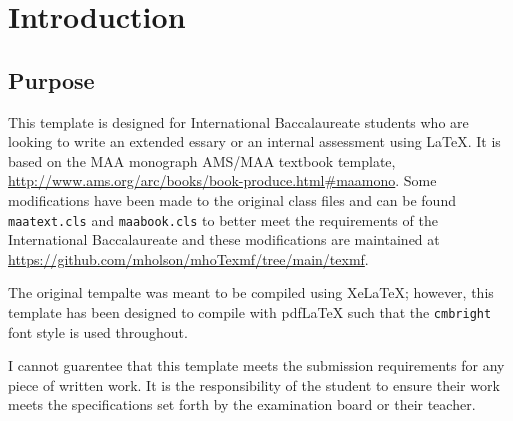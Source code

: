 \chapter{Introduction}

\section{Purpose}

This template is designed for International Baccalaureate students who
are looking to write an extended essary or an internal assessment using \LaTeX.
It is based on the MAA monograph AMS/MAA textbook template,
\url{http://www.ams.org/arc/books/book-produce.html#maamono}.  Some 
modifications have been made to the original class files and can be found
\verb!maatext.cls! and \verb!maabook.cls! to better meet the requirements of 
the International Baccalaureate and these modifications are maintained at 
\url{https://github.com/mholson/mhoTexmf/tree/main/texmf}.  

The original tempalte was meant to be compiled using XeLaTeX; however, this 
template has been designed to compile with pdfLaTeX such that the 
\verb!cmbright! font style is used throughout. \cite{Eigen1971}

I cannot guarentee that this template meets the submission requirements for
any piece of written work.  It is the responsibility of the student to 
ensure their work meets the specifications set forth by the examination board 
or their teacher.\cite{Olson2021}



